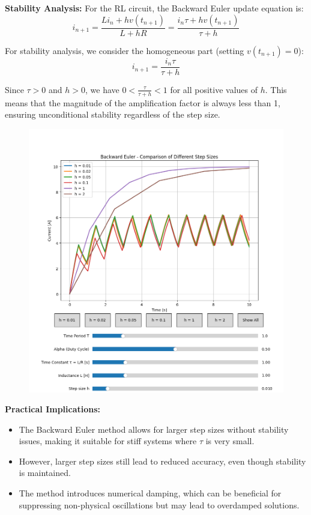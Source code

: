 \documentclass[12pt,a4paper]{report}
\begin{document}
\textbf{Stability Analysis:}
For the RL circuit, the Backward Euler update equation is:
\begin{equation}
i_{n+1} = \frac{Li_n + hv(t_{n+1})}{L + hR} = \frac{i_n\tau + hv(t_{n+1})}{\tau + h}
\end{equation}

For stability analysis, we consider the homogeneous part (setting $v(t_{n+1}) = 0$):
\begin{equation}
i_{n+1} = \frac{i_n\tau}{\tau + h}
\end{equation}

Since $\tau > 0$ and $h > 0$, we have $0 < \frac{\tau}{\tau + h} < 1$ for all positive values of $h$. This means that the magnitude of the amplification factor is always less than 1, ensuring unconditional stability regardless of the step size.
\begin{figure}[h!]
\centering
\includegraphics[scale=0.4]{figs/backward_euler_stability.png}
\end{figure}

\textbf{Practical Implications:}
\begin{itemize}
    \item The Backward Euler method allows for larger step sizes without stability issues, making it suitable for stiff systems where $\tau$ is very small.
    \item However, larger step sizes still lead to reduced accuracy, even though stability is maintained.
    \item The method introduces numerical damping, which can be beneficial for suppressing non-physical oscillations but may lead to overdamped solutions.
\end{itemize}
\end{document}
